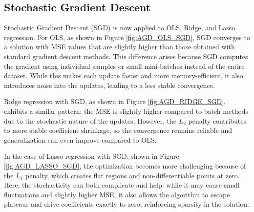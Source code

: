 \documentclass[
 reprint,            %
 amsmath,amssymb,
 aps,
]{revtex4-2}
\begin{document}
\subsection{Stochastic Gradient Descent}
\label{Stochastic Gradient Descent}
Stochastic Gradient Descent (SGD) is now applied to OLS, Ridge, and Lasso regression.
For OLS, as shown in Figure \ref{fig:AGD_OLS_SGD}, SGD converges to a solution with MSE values that are slightly higher than those obtained with standard gradient descent methods. 
This difference arises because SGD computes the gradient using individual samples or small mini-batches instead of the entire dataset. While this makes each update faster and more memory-efficient, it also introduces noise into the updates, leading to a less stable convergence.



Ridge regression with SGD, as shown in Figure \ref{fig:AGD_RIDGE_SGD}, exhibits a similar pattern: the MSE is slightly higher compared to batch methods due to the stochastic nature of the updates. However, the $L_2$ penalty contributes to more stable coefficient shrinkage, so the convergence remains reliable and generalization can even improve compared to OLS.



In the case of Lasso regression with SGD, shown in Figure \ref{fig:AGD_LASSO_SGD}, the optimization becomes more challenging because of the $L_1$ penalty, which creates flat regions and non-differentiable points at zero. Here, the stochasticity can both complicate and help: while it may cause small fluctuations and slightly higher MSE, it also allows the algorithm to escape plateaus and drive coefficients exactly to zero, reinforcing sparsity in the solution.


\end{document}
